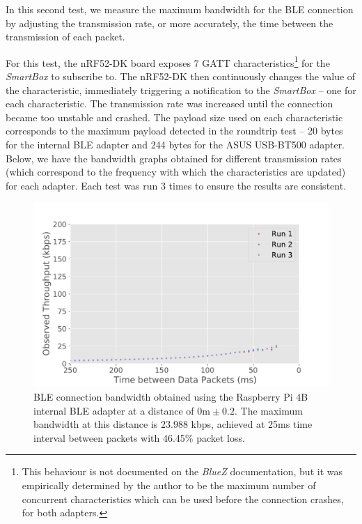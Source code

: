 In this second test, we measure the maximum bandwidth for the \acs{BLE} connection by adjusting the transmission rate, or more accurately, the time between the transmission of each packet. 

For this test, the nRF52-DK board exposes 7 \acs{GATT} characteristics\footnote{This behaviour is not documented on the \textit{BlueZ} documentation, but it was empirically determined by the author to be the maximum number of concurrent characteristics which can be used before the connection crashes, for both adapters.} for the \textit{SmartBox} to subscribe to. The nRF52-DK then continuously changes the value of the characteristic, immediately triggering a notification to the \textit{SmartBox} -- one for each characteristic. The transmission rate was increased until the connection became too unstable and crashed. The payload size used on each characteristic corresponds to the maximum payload detected in the roundtrip test -- 20 bytes for the internal \acs{BLE} adapter and 244 bytes for the ASUS USB-BT500 adapter.
Below, we have the bandwidth graphs obtained for different transmission rates (which correspond to the frequency with which the characteristics are updated) for each adapter. Each test was run 3 times to ensure the results are consistent.


\begin{figure}[H]
    \centering
    \includegraphics[width=0.75\linewidth]{images/ble-bandwidth-hci1-0cm.pdf}
    \caption[\acs{BLE} connection bandwidth obtained using the ASUS USB-BT500 adapter at a distance of 0m.]
    {\acs{BLE} connection bandwidth obtained using the Raspberry Pi 4B internal \acs{BLE} adapter at a distance of $0\text{m} \pm 0.2$. The maximum bandwidth at this distance is $23.988$ kbps, achieved at 25ms time interval between packets with 46.45\% packet loss.}
    \label{fig:ble-bandwidth-hci1-0m}
\end{figure}

